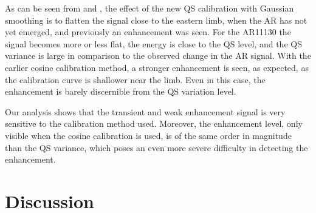 \documentclass{aa}
\begin{document}
As can be seen
from  and , the effect of the new QS calibration with Gaussian smoothing is
to flatten the \fff signal close to the eastern limb, when the AR has not yet emerged, and previously an enhancement was seen. For the AR11130 the \fff signal becomes more or less flat, the energy is close to the QS level, and the QS variance is large in comparison to the observed change in the AR \fff signal. With the earlier cosine calibration method, a stronger enhancement is seen, as expected, as the calibration curve is shallower near the limb. Even in this case, the enhancement is barely discernible from the QS variation level.

Our analysis shows that the transient
and weak enhancement signal is very sensitive to the calibration
method used. Moreover, the enhancement level, only visible
when the cosine calibration is used, is of the same order 
in magnitude than
the QS variance, which poses an even more severe difficulty in
detecting the enhancement.




\section{Discussion}
\end{document}
